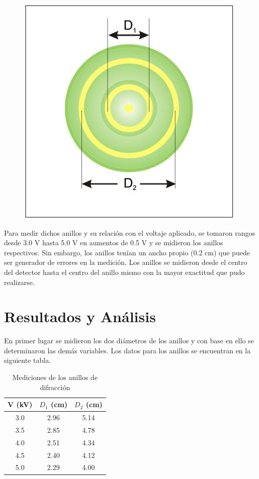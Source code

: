 \documentclass[%
 reprint,
 amsmath,amssymb,
 aps,
]{revtex4-1}
\begin{document}
\begin{figure}
\centering
\includegraphics[width=0.7\linewidth]{Anillos}
\caption[Anillos de difracción en el detector.]{}
\label{fig:anillos}
\end{figure}


Para medir dichos anillos y su relación con el voltaje aplicado, se tomaron rangos desde 3.0 V hasta 5.0 V en aumentos de 0.5 V y se midieron los anillos respectivos. Sin embargo, los anillos tenían un ancho propio (0.2 cm) que puede ser generador de errores en la medición. Los anillos se midieron desde el centro del detector hasta el centro del anillo mismo con la mayor exactitud que pudo realizarse. \\


\section{\label{sec:level1}Resultados y An\'alisis}
En primer lugar se midieron los dos diámetros de los anillos y con base en ello se determinaron las demás variables. Los datos para los anillos se encuentran en la siguiente tabla. \\

\begin{table}[h!]
\begin{tabular}{|c|c|c|}
	\hline V (kV) & $ D_1 $ (cm) & $ D_2 $ (cm) \\ 
	\hline  3.0 &  2.96 &  5.14 \\ 
	\hline  3.5 &  2.85 &  4.78\\ 
	\hline  4.0 &  2.51 &  4.34\\ 
	\hline  4.5 &  2.40 &  4.12\\ 
	\hline  5.0 &  2.29 &  4.00\\ 
	\hline
\end{tabular} 
\caption{Mediciones de los anillos de difracción} 
\end{table}
\end{document}
